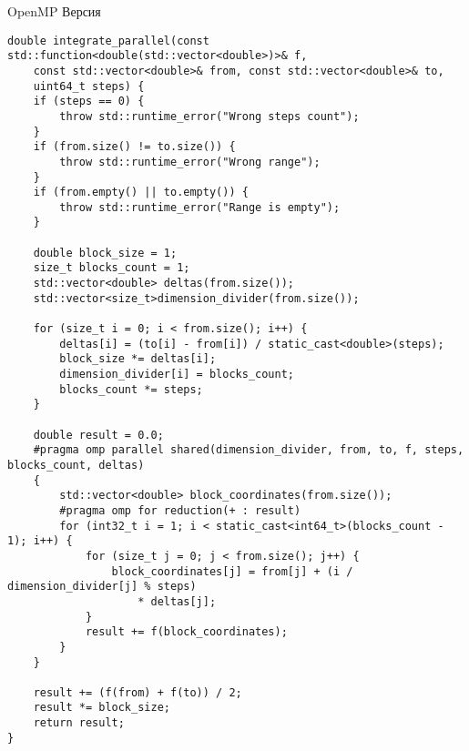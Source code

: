 \documentclass{report}
\begin{document}
\par OpenMP Версия
\begin{lstlisting}
double integrate_parallel(const std::function<double(std::vector<double>)>& f,
    const std::vector<double>& from, const std::vector<double>& to,
    uint64_t steps) {
    if (steps == 0) {
        throw std::runtime_error("Wrong steps count");
    }
    if (from.size() != to.size()) {
        throw std::runtime_error("Wrong range");
    }
    if (from.empty() || to.empty()) {
        throw std::runtime_error("Range is empty");
    }

    double block_size = 1;
    size_t blocks_count = 1;
    std::vector<double> deltas(from.size());
    std::vector<size_t>dimension_divider(from.size());

    for (size_t i = 0; i < from.size(); i++) {
        deltas[i] = (to[i] - from[i]) / static_cast<double>(steps);
        block_size *= deltas[i];
        dimension_divider[i] = blocks_count;
        blocks_count *= steps;
    }

    double result = 0.0;
    #pragma omp parallel shared(dimension_divider, from, to, f, steps, blocks_count, deltas)
    {
        std::vector<double> block_coordinates(from.size());
        #pragma omp for reduction(+ : result)
        for (int32_t i = 1; i < static_cast<int64_t>(blocks_count - 1); i++) {
            for (size_t j = 0; j < from.size(); j++) {
                block_coordinates[j] = from[j] + (i / dimension_divider[j] % steps)
                    * deltas[j];
            }
            result += f(block_coordinates);
        }
    }

    result += (f(from) + f(to)) / 2;
    result *= block_size;
    return result;
}
\end{lstlisting}
\end{document}

